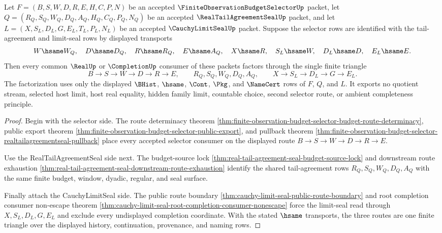 \begin{theorem}
\label{thm:finite-observation-budget-selector-tail-agreement-limit-seal-triangle}
Let $F=(B,S,W,D,R,E,H,C,P,N)$ be an accepted $\FiniteObservationBudgetSelectorUp$ packet, let $Q=(R_Q,S_Q,W_Q,D_Q,A_Q,H_Q,C_Q,P_Q,N_Q)$ be an accepted $\RealTailAgreementSealUp$ packet, and let $L=(X,S_L,D_L,G,E_L,T_L,P_L,N_L)$ be an accepted $\CauchyLimitSealUp$ packet. Suppose the selector rows are identified with the tail-agreement and limit-seal rows by displayed transports
$$
W \hsame W_Q,\quad D \hsame D_Q,\quad R \hsame R_Q,\quad E \hsame A_Q,
\quad X \hsame R,\quad S_L \hsame W,\quad D_L \hsame D,\quad E_L \hsame E.
$$
Then every common $\RealUp$ or $\CompletionUp$ consumer of these packets factors through the single finite triangle
$$
B \to S \to W \to D \to R \to E,\qquad R_Q,S_Q,W_Q,D_Q,A_Q,\qquad X \to S_L \to D_L \to G \to E_L.
$$
The factorization uses only the displayed $\BHist$, $\hsame$, $\Cont$, $\Pkg$, and $\NameCert$ rows of $F$, $Q$, and $L$. It exports no quotient stream, selected host limit, host real equality, hidden family limit, countable choice, second selector route, or ambient completeness principle.
\end{theorem}
\begin{proof}
Begin with the selector side. The route determinacy theorem \autoref{thm:finite-observation-budget-selector-budget-route-determinacy}, public export theorem \autoref{thm:finite-observation-budget-selector-public-export}, and pullback theorem \autoref{thm:finite-observation-budget-selector-realtailagreementseal-pullback} place every accepted selector consumer on the displayed route $B \to S \to W \to D \to R \to E$.

Use the RealTailAgreementSeal side next. The budget-source lock \autoref{thm:real-tail-agreement-seal-budget-source-lock} and downstream route exhaustion \autoref{thm:real-tail-agreement-seal-downstream-route-exhaustion} identify the shared tail-agreement rows $R_Q,S_Q,W_Q,D_Q,A_Q$ with the same finite budget, window, dyadic, regular, and seal surface.

Finally attach the CauchyLimitSeal side. The public route boundary \autoref{thm:cauchy-limit-seal-public-route-boundary} and root completion consumer non-escape theorem \autoref{thm:cauchy-limit-seal-root-completion-consumer-nonescape} force the limit-seal read through $X,S_L,D_L,G,E_L$ and exclude every undisplayed completion coordinate. With the stated $\hsame$ transports, the three routes are one finite triangle over the displayed history, continuation, provenance, and naming rows.
\end{proof}

